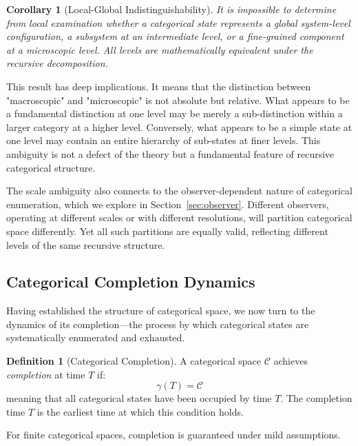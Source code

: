 \documentclass[12pt,a4paper]{article}
\newtheorem{corollary}[theorem]{Corollary}
\theoremstyle{definition}
\newtheorem{definition}[theorem]{Definition}
\theoremstyle{remark}
\begin{document}
\begin{corollary}[Local-Global Indistinguishability]
\label{cor:local_global}
It is impossible to determine from local examination whether a categorical state represents a global system-level configuration, a subsystem at an intermediate level, or a fine-grained component at a microscopic level. All levels are mathematically equivalent under the recursive decomposition.
\end{corollary}

This result has deep implications. It means that the distinction between "macroscopic" and "microscopic" is not absolute but relative. What appears to be a fundamental distinction at one level may be merely a sub-distinction within a larger category at a higher level. Conversely, what appears to be a simple state at one level may contain an entire hierarchy of sub-states at finer levels. This ambiguity is not a defect of the theory but a fundamental feature of recursive categorical structure.

The scale ambiguity also connects to the observer-dependent nature of categorical enumeration, which we explore in Section~\ref{sec:observer}. Different observers, operating at different scales or with different resolutions, will partition categorical space differently. Yet all such partitions are equally valid, reflecting different levels of the same recursive structure.

\subsection{Categorical Completion Dynamics}

Having established the structure of categorical space, we now turn to the dynamics of its completion—the process by which categorical states are systematically enumerated and exhausted.

\begin{definition}[Categorical Completion]
\label{def:completion}
A categorical space $\mathcal{C}$ achieves \emph{completion} at time $T$ if:
\begin{equation}
\gamma(T) = \mathcal{C}
\end{equation}
meaning that all categorical states have been occupied by time $T$. The completion time $T$ is the earliest time at which this condition holds.
\end{definition}

For finite categorical spaces, completion is guaranteed under mild assumptions.
\end{document}
